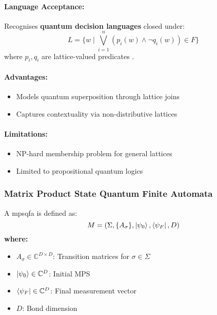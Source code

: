 \paragraph{Language Acceptance:}
Recognises \textbf{quantum decision languages} closed under:
\[
L = \{w \mid \bigvee_{i=1}^n (p_i(w) \land \neg q_i(w)) \in F\}
\]
where $p_i,q_i$ are lattice-valued predicates \cite{gudder1978quantum}.

\paragraph{Advantages:}
\begin{itemize}
    \item Models quantum superposition through lattice joins
    \item Captures contextuality via non-distributive lattices
\end{itemize}

\paragraph{Limitations:}
\begin{itemize}
    \item NP-hard membership problem for general lattices
    \item Limited to propositional quantum logics
\end{itemize}

\subsubsection{Matrix Product State Quantum Finite Automata}
\label{subsec:mpsqfa}

\begin{definition}
A \gls{mpsqfa} is defined as:
\[
M = (\Sigma, \{A_\sigma\}, \ket{\psi_0}, \bra{\psi_F}, D)
\]
\textbf{where:}
\begin{itemize}
    \item $A_\sigma \in \mathbb{C}^{D \times D}$: Transition matrices for $\sigma \in \Sigma$
    \item $\ket{\psi_0} \in \mathbb{C}^D$: Initial MPS
    \item $\bra{\psi_F} \in \mathbb{C}^D$: Final measurement vector
    \item $D$: Bond dimension
\end{itemize}
\end{definition}

